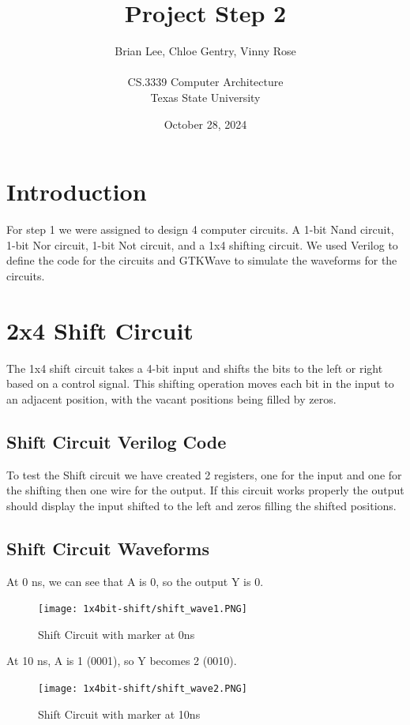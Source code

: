 \documentclass[12pt]{article}
\title{Project Step 2}
\author{Brian Lee, Chloe Gentry, Vinny Rose\\
\AND\\
\AND
\AND
\AND
\AND
	CS.3339 Computer Architecture\\
\AND
	Texas State University\\
}
\date{October 28, 2024}
\begin{document}
\maketitle

\newpage
\tableofcontents
\thispagestyle{empty}


\newpage
\setcounter{page}{1}
\section{Introduction}
For step 1 we were assigned to design 4 computer circuits. A 1-bit Nand circuit, 1-bit Nor circuit, 1-bit Not circuit, and a 1x4 shifting circuit. We used Verilog to define the code for the circuits and GTKWave to simulate the waveforms for the circuits.

\section{2x4 Shift Circuit}
\label{sec:headings}

The 1x4 shift circuit takes a 4-bit input and shifts the bits to the left or right based on a control signal. This shifting operation moves each bit in the input to an adjacent position, with the vacant positions being filled by zeros. 

\subsection{Shift Circuit Verilog Code}


To test the Shift circuit we have created 2 registers, one for the input and one for the shifting then one wire for the output. If this circuit works properly the output should display the input shifted to the left and zeros filling the shifted positions.



\subsection{Shift Circuit Waveforms}

At 0 ns, we can see that A is 0, so the output Y is 0.
\begin{figure}[H]
    \centering
    \texttt{[image: 1x4bit-shift/shift\_wave1.PNG]}
    \caption{Shift Circuit with marker at 0ns}
    \label{fig:shift-wave1}
\end{figure}

At 10 ns, A is 1 (0001), so Y becomes 2 (0010).
\begin{figure}[H]
    \centering
    \texttt{[image: 1x4bit-shift/shift\_wave2.PNG]}
    \caption{Shift Circuit with marker at 10ns}
    \label{fig:shift-wave2}
\end{figure}
\end{document}
